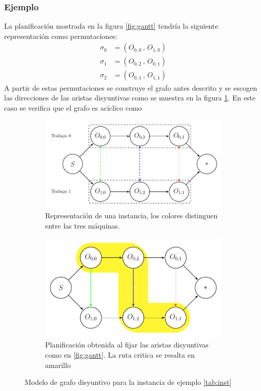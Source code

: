 \subsubsection*{Ejemplo}
La planificación mostrada en la figura \ref{fig:gantt} tendría la siguiente representación como permutaciones:
\begin{align*}
\sigma_0 &= (O_{0,0}\,,\,O_{1,0})\\
\sigma_1 &= (O_{0,2}\,,\,O_{0,1})\\
\sigma_2 &= (O_{0,1}\,,\,O_{1,1})
\end{align*}
A partir de estas permutaciones se construye el grafo antes descrito y se escogen las direcciones de las aristas disyuntivas como se muestra en la figura \ref{fig:dgraph}. En este caso se verifica que el grafo es acíclico como 
\begin{figure}[H]
    \centering
    \begin{subfigure}{.8\textwidth}
        \centering
        \includegraphics[width=.8\linewidth]{Imagenes/disyuntive.pdf}
        \caption{Representación de una instancia, los colores distinguen entre las tres máquinas.}
    \end{subfigure}
    \begin{subfigure}{.8\textwidth}
        \centering
        \includegraphics[width=.8\linewidth]{Imagenes/plandisyuntive.pdf}
        \caption{Planificación obtenida al fijar las aristas disyuntivas como en \ref{fig:gantt}. La ruta critica se resalta en amarillo}
    \end{subfigure}
\caption{Modelo de grafo disyuntivo para la instancia de ejemplo \ref{tab:inst}}
        \label{fig:dgraph}
\end{figure}

